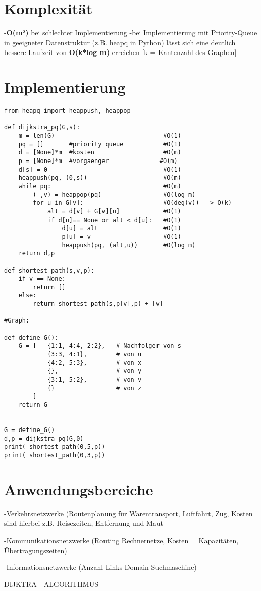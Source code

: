 \section{Komplexität}

-\textbf{O(m²) }bei schlechter Implementierung
-bei Implementierung mit Priority-Queue in geeigneter Datenstruktur (z.B. heapq in Python) lässt sich  eine deutlich bessere Laufzeit von \textbf{O(k*log m)} erreichen [k = Kantenzahl des Graphen]

\section{Implementierung}

\lstset{language=Python}
\begin{lstlisting}
from heapq import heappush, heappop

def dijkstra_pq(G,s):
    m = len(G)                              #O(1)
    pq = []       #priority queue           #O(1)
    d = [None]*m  #kosten                   #O(m)
    p = [None]*m  #vorgaenger		       #O(m)
    d[s] = 0                                #O(1)
    heappush(pq, (0,s))                     #O(m)
    while pq:                               #O(m)
        (_,v) = heappop(pq)                 #O(log m)
        for u in G[v]:                      #O(deg(v)) --> O(k)  
            alt = d[v] + G[v][u]            #O(1)
            if d[u]== None or alt < d[u]:   #O(1)
                d[u] = alt		            #O(1)	
               	p[u] = v                    #O(1)
                heappush(pq, (alt,u))       #O(log m)        
    return d,p

def shortest_path(s,v,p):
	if v == None:
		return []
	else:
		return shortest_path(s,p[v],p) + [v]
 
#Graph: 
    
def define_G():
    G = [   {1:1, 4:4, 2:2},   # Nachfolger von s
            {3:3, 4:1},        # von u
            {4:2, 5:3},        # von x
            {},                # von y
            {3:1, 5:2},        # von v
            {}                 # von z
        ]
    return G


G = define_G()
d,p = dijkstra_pq(G,0)
print( shortest_path(0,5,p))
print( shortest_path(0,3,p))
\end{lstlisting}

\section{Anwendungsbereiche}

-Verkehrsnetzwerke (Routenplanung für Warentransport, Luftfahrt, Zug, Kosten sind hierbei z.B. Reisezeiten, Entfernung und Maut

-Kommunikationsnetzwerke (Routing Rechnernetze, Kosten = Kapazitäten, Übertragungszeiten)

-Informationsnetzwerke (Anzahl Links Domain Suchmaschine)

DIJKTRA - ALGORITHMUS